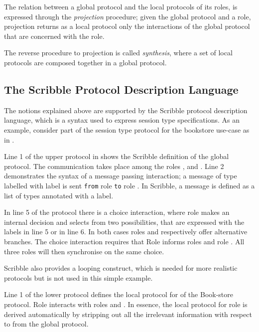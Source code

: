 The relation between a global protocol and the
local protocols of its roles, is expressed
through the {\em projection} procedure;
given the global protocol and a role, projection
returns as a local protocol only the
interactions of the global protocol that are concerned with
the role.

The reverse procedure to projection is called {\em synthesis},
where a set of local protocols are composed together in a global
protocol.



\subsection{The Scribble Protocol Description Language}
\label{sec:scribble}
The notions explained above are supported by the
Scribble protocol description language,
which is a syntax used to express session type specifications.
As an example,
consider part of the session type protocol for the bookstore
use-case as in . 




Line 1 of the upper protocol in  shows the
Scribble definition of the global protocol. 
The communication takes place
among the roles \BuyerOne, \BuyerTwo and \Seller. Line 2 demonstrates
the syntax of a message passing interaction; a message
of type  labelled with label  is sent \lstinline|from|
role \BuyerOne \lstinline|to| role \Seller. In Scribble, a message is
defined as a list of types annotated with a label.

In line 5 of the protocol 
there is a choice interaction,
where role \BuyerTwo makes an internal decision and selects
from two possibilities, that are
expressed with the labels  in line 5 or  in line 6.
In  both cases roles \BuyerOne and \Seller respectively offer
alternative branches. The choice interaction requires that
Role \BuyerTwo informs roles \BuyerOne and role \Seller. All
three roles will then synchronise on the same choice.

Scribble also provides a looping construct, which is needed for more realistic protocols but is not used in this simple example.


Line 1 of the lower protocol defines the local protocol 
for \BuyerOne of the Book-store protocol. Role \BuyerOne
interacts with roles \BuyerTwo and \Seller. In essence,
the local protocol for role \BuyerOne is derived automatically
by stripping out all the irrelevant information with respect
to \BuyerOne from the global protocol.

